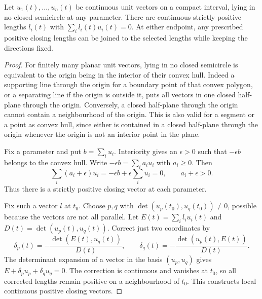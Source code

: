 \begin{lemma}
\label{lem:transport-lengths}\leanok
Let $u_1(t),\ldots,u_n(t)$ be continuous unit vectors on a compact interval,
lying in no closed semicircle at any parameter. There are continuous strictly
positive lengths $l_i(t)$ with $\sum_i l_i(t)u_i(t)=0$. At either endpoint,
any prescribed positive closing lengths can be joined to the selected lengths
while keeping the directions fixed.

\end{lemma}
\begin{proof}\leanok
For finitely many planar unit vectors, lying in no closed semicircle is
equivalent to the origin being in the interior of their convex hull.
Indeed a supporting line through the origin for a boundary point of that
convex polygon, or a separating line if the origin is outside it, puts all
vectors in one closed half-plane through the origin. Conversely, a closed
half-plane through the origin cannot contain a neighbourhood of the origin.
This is also valid for a segment or a point as convex hull, since either is
contained in a closed half-plane through the origin whenever the origin is
not an interior point in the plane.

Fix a parameter and put $b=\sum_i u_i$. Interiority gives an $\epsilon>0$
such that $-\epsilon b$ belongs to the convex hull. Write
$-\epsilon b=\sum_i a_i u_i$ with $a_i\geq0$. Then
\begin{equation}\label{transport:positive-close}
 \sum_i(a_i+\epsilon)u_i=-\epsilon b+\epsilon\sum_i u_i=0,
 \qquad a_i+\epsilon>0.
\end{equation}
Thus there is a strictly positive closing vector at each parameter.

Fix such a vector $l$ at $t_0$. Choose $p,q$ with
$\det(u_p(t_0),u_q(t_0))\ne0$, possible because the vectors are not all
parallel. Let $E(t)=\sum_i l_i u_i(t)$ and
$D(t)=\det(u_p(t),u_q(t))$. Correct just two coordinates by
\begin{equation}\label{transport:cramer}
 \delta_p(t)=-\frac{\det(E(t),u_q(t))}{D(t)},\qquad
 \delta_q(t)=-\frac{\det(u_p(t),E(t))}{D(t)}.
\end{equation}
The determinant expansion of a vector in the basis $(u_p,u_q)$ gives
$E+\delta_pu_p+\delta_qu_q=0$. The correction is continuous and vanishes
at $t_0$, so all corrected lengths remain positive on a neighbourhood of
$t_0$. This constructs local continuous positive closing vectors.


\end{proof}
